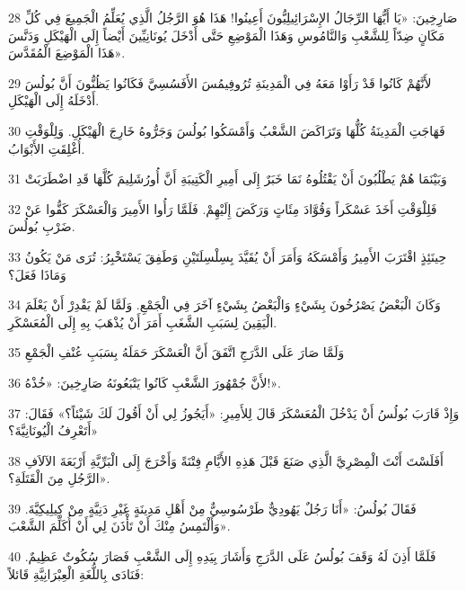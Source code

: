 \par 28 صَارِخِينَ: «يَا أَيُّهَا الرِّجَالُ الإِسْرَائِيلِيُّونَ أَعِينُوا! هَذَا هُوَ الرَّجُلُ الَّذِي يُعَلِّمُ الْجَمِيعَ فِي كُلِّ مَكَانٍ ضِدّاً لِلشَّعْبِ وَالنَّامُوسِ وَهَذَا الْمَوْضِعِ حَتَّى أَدْخَلَ يُونَانِيِّينَ أَيْضاً إِلَى الْهَيْكَلِ وَدَنَّسَ هَذَا الْمَوْضِعَ الْمُقَدَّسَ».
\par 29 لأَنَّهُمْ كَانُوا قَدْ رَأَوْا مَعَهُ فِي الْمَدِينَةِ تُرُوفِيمُسَ الأَفَسُسِيَّ فَكَانُوا يَظُنُّونَ أَنَّ بُولُسَ أَدْخَلَهُ إِلَى الْهَيْكَلِ.
\par 30 فَهَاجَتِ الْمَدِينَةُ كُلُّهَا وَتَرَاكَضَ الشَّعْبُ وَأَمْسَكُوا بُولُسَ وَجَرُّوهُ خَارِجَ الْهَيْكَلِ. وَلِلْوَقْتِ أُغْلِقَتِ الأَبْوَابُ.
\par 31 وَبَيْنَمَا هُمْ يَطْلُبُونَ أَنْ يَقْتُلُوهُ نَمَا خَبَرٌ إِلَى أَمِيرِ الْكَتِيبَةِ أَنَّ أُورُشَلِيمَ كُلَّهَا قَدِ اضْطَرَبَتْ
\par 32 فَلِلْوَقْتِ أَخَذَ عَسْكَراً وَقُوَّادَ مِئَاتٍ وَرَكَضَ إِلَيْهِمْ. فَلَمَّا رَأُوا الأَمِيرَ وَالْعَسْكَرَ كَفُّوا عَنْ ضَرْبِ بُولُسَ.
\par 33 حِينَئِذٍ اقْتَرَبَ الأَمِيرُ وَأَمْسَكَهُ وَأَمَرَ أَنْ يُقَيَّدَ بِسِلْسِلَتَيْنِ وَطَفِقَ يَسْتَخْبِرُ: تُرَى مَنْ يَكُونُ وَمَاذَا فَعَلَ؟
\par 34 وَكَانَ الْبَعْضُ يَصْرُخُونَ بِشَيْءٍ وَالْبَعْضُ بِشَيْءٍ آخَرَ فِي الْجَمْعِ. وَلَمَّا لَمْ يَقْدِرْ أَنْ يَعْلَمَ الْيَقِينَ لِسَبَبِ الشَّغَبِ أَمَرَ أَنْ يُذْهَبَ بِهِ إِلَى الْمُعَسْكَرِ.
\par 35 وَلَمَّا صَارَ عَلَى الدَّرَجِ اتَّفَقَ أَنَّ الْعَسْكَرَ حَمَلَهُ بِسَبَبِ عُنْفِ الْجَمْعِ
\par 36 لأَنَّ جُمْهُورَ الشَّعْبِ كَانُوا يَتْبَعُونَهُ صَارِخِينَ: «خُذْهُ!».
\par 37 وَإِذْ قَارَبَ بُولُسُ أَنْ يَدْخُلَ الْمُعَسْكَرَ قَالَ لِلأَمِيرِ: «أَيَجُوزُ لِي أَنْ أَقُولَ لَكَ شَيْئاً؟» فَقَالَ: «أَتَعْرِفُ الْيُونَانِيَّةَ؟
\par 38 أَفَلَسْتَ أَنْتَ الْمِصْرِيَّ الَّذِي صَنَعَ قَبْلَ هَذِهِ الأَيَّامِ فِتْنَةً وَأَخْرَجَ إِلَى الْبَرِّيَّةِ أَرْبَعَةَ الآلاَفِ الرَّجُلِ مِنَ الْقَتَلَةِ؟».
\par 39 فَقَالَ بُولُسُ: «أَنَا رَجُلٌ يَهُودِيٌّ طَرْسُوسِيٌّ مِنْ أَهْلِ مَدِينَةٍ غَيْرِ دَنِيَّةٍ مِنْ كِيلِيكِيَّةَ. وَأَلْتَمِسُ مِنْكَ أَنْ تَأْذَنَ لِي أَنْ أُكَلِّمَ الشَّعْبَ».
\par 40 فَلَمَّا أَذِنَ لَهُ وَقَفَ بُولُسُ عَلَى الدَّرَجِ وَأَشَارَ بِيَدِهِ إِلَى الشَّعْبِ فَصَارَ سُكُوتٌ عَظِيمٌ. فَنَادَى بِاللُّغَةِ الْعِبْرَانِيَّةِ قَائلاً:

